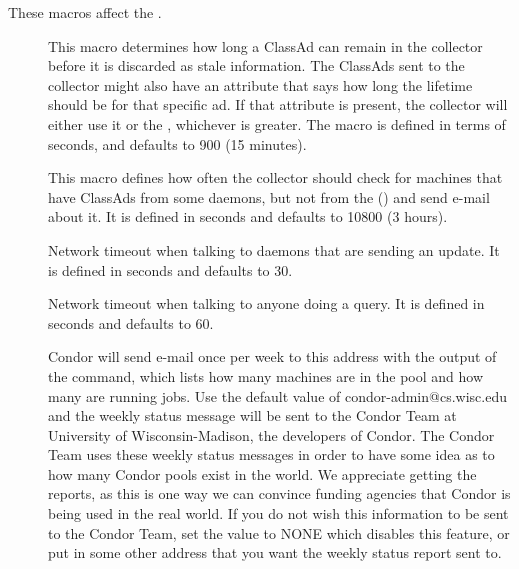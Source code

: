 These macros affect the .
\begin{description}
  
\item[] \label{param:ClassadLifetime} This
  macro determines how long a ClassAd can remain in the collector
  before it is discarded as stale information.  The ClassAds sent to
  the collector might also have an attribute that says how long the
  lifetime should be for that specific ad.  If that attribute is
  present, the collector will either use it or the
  , whichever is greater.  The macro is
  defined in terms of seconds, and defaults to 900 (15 minutes).
  
\item[]
  \label{param:MasterCheckInterval}  This macro defines how often the
  collector should check for machines that have ClassAds from some
  daemons, but not from the  ()
  and send e-mail about it.  It is defined in seconds and 
  defaults to 10800 (3 hours).
  
\item[] \label{param:ClientTimeout} Network
  timeout when talking to daemons that are sending an update.  
  It is defined in seconds and defaults to 30.
  
\item[] \label{param:QueryTimeout} Network
  timeout when talking to anyone doing a query. It is defined in seconds
  and defaults to 60.
  
\item[] \label{param:CondorDevelopers}
  Condor will send e-mail once per week to this address with the output
  of the  command, which lists how many machines
  are in the pool and how many are running jobs.  Use the default
  value of condor-admin@cs.wisc.edu and
  the weekly status message will be sent to the Condor Team at University of
  Wisconsin-Madison, the developers of Condor.  The Condor Team uses
  these weekly status messages in order to have some idea as to how
  many Condor pools exist in the world.  We appreciate
  getting the reports, as this is one way we can convince funding
  agencies that Condor is being used in the real world.  If you do
  not wish this information to be sent to the Condor Team,
  set the value to NONE which disables this feature, or put in some other
  address that you want the weekly status report sent to.


\end{description}
